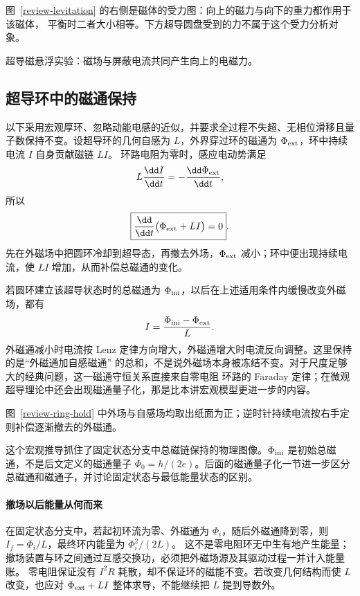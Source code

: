 图~\ref{review-levitation} 的右侧是磁体的受力图：向上的磁力与向下的重力都作用于该磁体，
平衡时二者大小相等。下方超导圆盘受到的力不属于这个受力分析对象。

\levitationDiagram

%
{超导磁悬浮实验：磁场与屏蔽电流共同产生向上的电磁力。\label{review-levitation-scene}}

\subsection{超导环中的磁通保持}

以下采用宏观厚环、忽略动能电感的近似，并要求全过程不失超、无相位滑移且量子数保持不变。设超导环的几何自感为 $L$，外界穿过环的磁通为 $\Phi_{\rm ext}$，环中持续电流 $I$ 自身贡献磁链 $LI$。
环路电阻为零时，感应电动势满足
\begin{equation}
  L\frac{\dd I}{\dd t}=-\frac{\dd\Phi_{\rm ext}}{\dd t},
\end{equation}
所以
\begin{equation}
  \boxed{\frac{\dd}{\dd t}\bigl(\Phi_{\rm ext}+LI\bigr)=0}.
\end{equation}
先在外磁场中把圆环冷却到超导态，再撤去外场，$\Phi_{\rm ext}$ 减小；环中便出现持续电流，使 $LI$
增加，从而补偿总磁通的变化。

若圆环建立该超导状态时的总磁通为 $\Phi_{\rm ini}$，以后在上述适用条件内缓慢改变外磁场，都有
\begin{equation}
  I=\frac{\Phi_{\rm ini}-\Phi_{\rm ext}}{L}.
\end{equation}
外磁通减小时电流按 Lenz 定律方向增大，外磁通增大时电流反向调整。这里保持的是“外磁通加自感磁通”
的总和，不是说外磁场本身被冻结不变。对于尺度足够大的经典问题，这一磁通守恒关系直接来自零电阻
环路的 Faraday 定律；在微观超导理论中还会出现磁通量子化，那是比本讲宏观模型更进一步的内容。

图~\ref{review-ring-hold} 中外场与自感场均取出纸面为正；逆时针持续电流按右手定则补偿逐渐撤去的外磁通。

\superconductingRingDiagram

这个宏观推导抓住了固定状态分支中总磁链保持的物理图像。$\Phi_{\rm ini}$ 是初始总磁通，不是后文定义的磁通量子 $\Phi_0=h/(2e)$。后面的磁通量子化一节进一步区分总磁通和磁通子，并讨论固定状态与最低能量状态的区别。

\paragraph{撤场以后能量从何而来}
在固定状态分支中，若起初环流为零、外磁通为 $\Phi_i$，随后外磁通降到零，则
$I_f=\Phi_i/L$，最终环内能量为 $\Phi_i^2/(2L)$。
这不是零电阻环无中生有地产生能量；撤场装置与环之间通过互感交换功，必须把外磁场源及其驱动过程一并计入能量账。
零电阻保证没有 $I^2R$ 耗散，却不保证环的磁能不变。若改变几何结构而使 $L$ 改变，也应对 $\Phi_{\rm ext}+LI$ 整体求导，不能继续把 $L$ 提到导数外。

